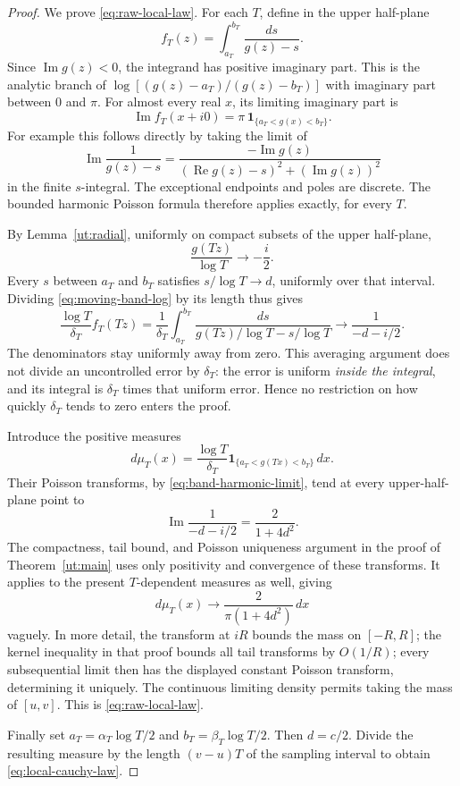 \begin{proof}
We prove \eqref{eq:raw-local-law}.  For each $T$, define in the upper
half-plane
\begin{equation}\label{eq:moving-band-log}
 f_T(z)=\int_{a_T}^{b_T}\frac{ds}{g(z)-s}.
\end{equation}
Since $\operatorname{Im}g(z)<0$, the integrand has positive imaginary
part.  This is the analytic branch of
$\log[(g(z)-a_T)/(g(z)-b_T)]$ with imaginary part between $0$ and $\pi$.
For almost every real $x$, its limiting imaginary part is
\[
 \operatorname{Im}f_T(x+i0)
        =\pi\,\boldsymbol1_{\{a_T<g(x)<b_T\}}.
\]
For example this follows directly by taking the limit of
\[
 \operatorname{Im}\frac1{g(z)-s}
        =\frac{-\operatorname{Im}g(z)}
                     {(\operatorname{Re}g(z)-s)^2+(\operatorname{Im}g(z))^2}
\]
in the finite $s$-integral.  The exceptional endpoints and poles are
discrete.  The bounded harmonic Poisson formula therefore applies
exactly, for every $T$.

By Lemma~\ref{ut:radial}, uniformly on compact subsets of the upper
half-plane,
\[
 \frac{g(Tz)}{\log T}\longrightarrow-\frac i2.
\]
Every $s$ between $a_T$ and $b_T$ satisfies $s/\log T\to d$, uniformly
over that interval.  Dividing \eqref{eq:moving-band-log} by its length
thus gives
\begin{equation}\label{eq:band-harmonic-limit}
 \frac{\log T}{\delta_T}f_T(Tz)
       =\frac1{\delta_T}\int_{a_T}^{b_T}
               \frac{ds}{g(Tz)/\log T-s/\log T}
       \longrightarrow\frac1{-d-i/2}.
\end{equation}
The denominators stay uniformly away from zero.  This averaging argument
does not divide an uncontrolled error by $\delta_T$: the error is uniform
\emph{inside the integral}, and its integral is $\delta_T$ times that
uniform error.  Hence no restriction on how quickly $\delta_T$ tends to
zero enters the proof.

Introduce the positive measures
\[
 d\mu_T(x)=\frac{\log T}{\delta_T}
       \boldsymbol1_{\{a_T<g(Tx)<b_T\}}\,dx.
\]
Their Poisson transforms, by \eqref{eq:band-harmonic-limit}, tend at every
upper-half-plane point to
\[
 \operatorname{Im}\frac1{-d-i/2}=\frac2{1+4d^2}.
\]
The compactness, tail bound, and Poisson uniqueness argument in the
proof of Theorem~\ref{ut:main} uses only positivity and convergence of
these transforms.  It applies to the present $T$-dependent measures as
well, giving
\[
 d\mu_T(x)\longrightarrow\frac2{\pi(1+4d^2)}\,dx
\]
vaguely.  In more detail, the transform at $iR$ bounds the mass on
$[-R,R]$; the kernel inequality in that proof bounds all tail transforms
by $O(1/R)$; every subsequential limit then has the displayed constant
Poisson transform, determining it uniquely.  The continuous limiting
density permits taking the mass of $[u,v]$.  This is
\eqref{eq:raw-local-law}.

Finally set $a_T=\alpha_T\log T/2$ and
$b_T=\beta_T\log T/2$.  Then $d=c/2$.  Divide the resulting measure
by the length $(v-u)T$ of the sampling interval to obtain
\eqref{eq:local-cauchy-law}.
\end{proof}

